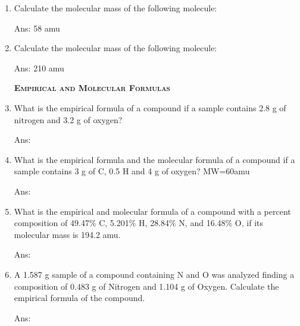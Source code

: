 \documentclass[main.tex]{subfiles}
\begin{document}
\begin{multicols*}{2}
\begin{enumerate}
\item Calculate the molecular mass of the following molecule: 
\begin{flushright}\small Ans: 58 amu \end{flushright}
\item Calculate the molecular mass of the following molecule: 
\begin{flushright}\small Ans: 210 amu \end{flushright}

{\raggedright\textsc{\textbf{Empirical and Molecular Formulas }}\par}

\item What is the empirical formula of a compound if a sample contains 2.8 g of nitrogen and 3.2 g of oxygen?
\begin{flushright}\small Ans:  \end{flushright}


\item What is the empirical formula and the molecular formula of a compound if a sample contains 3 g of C, 0.5 H and 4 g of oxygen? MW=60amu
\begin{flushright}\small Ans:  \end{flushright}


\item What is the empirical and molecular formula of a compound with a percent composition of 49.47\% C, 5.201\% H, 28.84\% N, and 16.48\% O, if its molecular mass is 194.2 amu.
\begin{flushright}\small Ans:  \end{flushright}

\item A 1.587 g sample of a compound containing N and O was analyzed finding a composition of 0.483 g of Nitrogen and 1.104 g of Oxygen. Calculate the empirical formula of the compound.
\begin{flushright}\small Ans:  \end{flushright}

\restoregeometry
\end{enumerate}
\end{multicols*}
\pagecolor{green!10}\afterpage{\nopagecolor}\newpage
\end{document}
